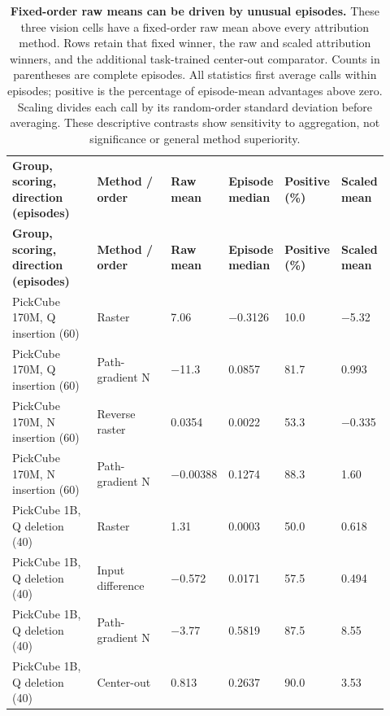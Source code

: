 \setlength{\tabcolsep}{2pt}
\begin{longtable}{p{0.250\linewidth} p{0.220\linewidth} p{0.110\linewidth} p{0.120\linewidth} p{0.100\linewidth} p{0.120\linewidth}}
\noalign{\addtocounter{table}{-1}}
\caption*{\textbf{Fixed-order raw means can be driven by unusual episodes.} These three vision cells have a fixed-order raw mean above every attribution method. Rows retain that fixed winner, the raw and scaled attribution winners, and the additional task-trained center-out comparator. Counts in parentheses are complete episodes. All statistics first average calls within episodes; positive is the percentage of episode-mean advantages above zero. Scaling divides each call by its random-order standard deviation before averaging. These descriptive contrasts show sensitivity to aggregation, not significance or general method superiority.}\\
\toprule
\textbf{Group, scoring, direction (episodes)} & \textbf{Method / order} & \textbf{Raw mean} & \textbf{Episode median} & \textbf{Positive (\%)} & \textbf{Scaled mean} \\
\midrule\endfirsthead
\toprule
\textbf{Group, scoring, direction (episodes)} & \textbf{Method / order} & \textbf{Raw mean} & \textbf{Episode median} & \textbf{Positive (\%)} & \textbf{Scaled mean} \\
\midrule\endhead
\bottomrule\endfoot
PickCube 170M, Q insertion (60) & Raster & 7.06 & −0.3126 & 10.0 & −5.32 \\
PickCube 170M, Q insertion (60) & Path-gradient N & −11.3 & 0.0857 & 81.7 & 0.993 \\
PickCube 170M, N insertion (60) & Reverse raster & 0.0354 & 0.0022 & 53.3 & −0.335 \\
PickCube 170M, N insertion (60) & Path-gradient N & −0.00388 & 0.1274 & 88.3 & 1.60 \\
PickCube 1B, Q deletion (40) & Raster & 1.31 & 0.0003 & 50.0 & 0.618 \\
PickCube 1B, Q deletion (40) & Input difference & −0.572 & 0.0171 & 57.5 & 0.494 \\
PickCube 1B, Q deletion (40) & Path-gradient N & −3.77 & 0.5819 & 87.5 & 8.55 \\
PickCube 1B, Q deletion (40) & Center-out & 0.813 & 0.2637 & 90.0 & 3.53 \\
\end{longtable}
